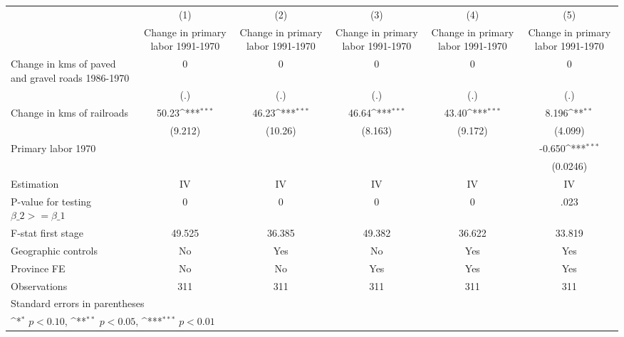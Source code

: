 {
\def\sym#1{\ifmmode^{#1}\else\(^{#1}\)\fi}
\begin{tabular}{l*{5}{c}}
\hline\hline
                    &\multicolumn{1}{c}{(1)}&\multicolumn{1}{c}{(2)}&\multicolumn{1}{c}{(3)}&\multicolumn{1}{c}{(4)}&\multicolumn{1}{c}{(5)}\\
                    &\multicolumn{1}{c}{Change in primary labor 1991-1970}&\multicolumn{1}{c}{Change in primary labor 1991-1970}&\multicolumn{1}{c}{Change in primary labor 1991-1970}&\multicolumn{1}{c}{Change in primary labor 1991-1970}&\multicolumn{1}{c}{Change in primary labor 1991-1970}\\
\hline
Change in kms of paved and gravel roads 1986-1970&           0         &           0         &           0         &           0         &           0         \\
                    &         (.)         &         (.)         &         (.)         &         (.)         &         (.)         \\
[1em]
Change in kms of railroads&       50.23\sym{***}&       46.23\sym{***}&       46.64\sym{***}&       43.40\sym{***}&       8.196\sym{**} \\
                    &     (9.212)         &     (10.26)         &     (8.163)         &     (9.172)         &     (4.099)         \\
[1em]
Primary labor 1970  &                     &                     &                     &                     &      -0.650\sym{***}\\
                    &                     &                     &                     &                     &    (0.0246)         \\
\hline
Estimation          &          IV         &          IV         &          IV         &          IV         &          IV         \\
P-value for testing $\beta\_2 >= \beta\_1$&           0         &           0         &           0         &           0         &        .023         \\
F-stat first stage  &      49.525         &      36.385         &      49.382         &      36.622         &      33.819         \\
Geographic controls &          No         &         Yes         &          No         &         Yes         &         Yes         \\
Province FE         &          No         &          No         &         Yes         &         Yes         &         Yes         \\
Observations        &         311         &         311         &         311         &         311         &         311         \\
\hline\hline
\multicolumn{6}{l}{\footnotesize Standard errors in parentheses}\\
\multicolumn{6}{l}{\footnotesize \sym{*} \(p<0.10\), \sym{**} \(p<0.05\), \sym{***} \(p<0.01\)}\\
\end{tabular}
}
